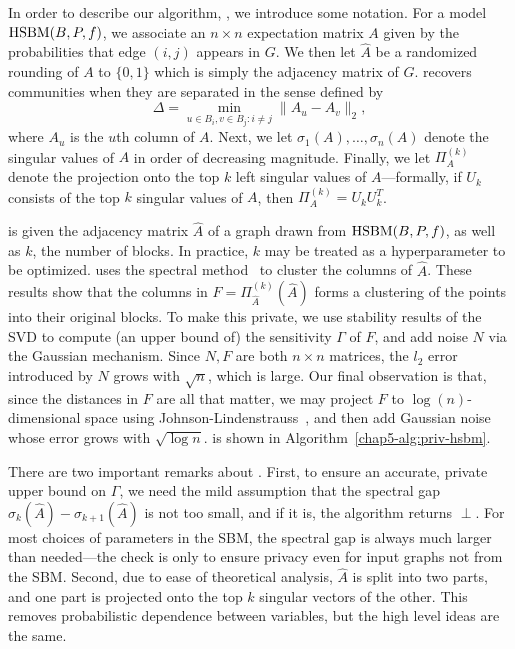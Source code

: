 In order to describe our algorithm, \dpcom{}, we introduce some notation. For a model $\textnormal{HSBM}{}(B,P,f)$, we associate an $n \times n$ expectation matrix $A$ given by the probabilities that edge $(i,j)$ appears in $G$. We then let $\hat{A}$ be a randomized rounding of $A$ to $\{0,1\}$ which is simply the adjacency matrix of $G$. \dpcom{} recovers communities when they are separated in the sense defined by 
\[
    \Delta = \min_{u \in B_i, v \in B_j : i \neq j} \|A_u - A_v\|_2,
\]
where $A_u$ is the $u$th column of $A$. Next, we let $\sigma_1(A), \ldots, \sigma_n(A)$ denote the singular values of $A$ in order of decreasing magnitude. Finally, we let $\Pi_A^{(k)}$ denote the projection onto the top $k$ left singular values of $A$---formally, if $U_k$ consists of the top $k$ singular values of $A$, then $\Pi_A^{(k)} = U_kU_k^T$.

\dpcom{} is given the adjacency matrix $\hat{A}$ of a graph drawn from $\textnormal{HSBM}(B,P,f)$, as well as $k$, the number of blocks. In practice, $k$ may be treated as a hyperparameter to be optimized. \dpcom{} uses the spectral method~\citep{mcsherry2001spectral, vu2014simple} to cluster the columns of $\hat{A}$. These results show that the columns in $F = \Pi_{\hat{A}}^{(k)}(\hat{A})$ forms a clustering of the points into their original blocks. To make this private, we use stability results of the SVD to compute (an upper bound of) the sensitivity $\Gamma$ of $F$, and add noise $N$ via the Gaussian mechanism. Since $N,F$ are both $n \times n$ matrices, the $l_2$ error introduced by $N$ grows with $\sqrt{n}$, which is large. Our final observation is that, since the distances in $F$ are all that matter, we may project $F$ to $\log(n)$-dimensional space using Johnson-Lindenstrauss~\citep{johnson1984extensions}, and then add Gaussian noise whose error grows with $\sqrt{\log n}$. \dpcom{} is shown in Algorithm~\ref{chap5-alg:priv-hsbm}.

There are two important remarks about \dpcom{}. First, to ensure an accurate, private upper bound on $\Gamma$, we need the mild assumption that the spectral gap $\sigma_k(\hat{A}) - \sigma_{k+1}(\hat{A})$ is not too small, and if it is, the algorithm returns $\perp$. For most choices of parameters in the SBM, the spectral gap is always much larger than needed---the check is only to ensure privacy even for input graphs not from the SBM. Second, due to ease of theoretical analysis, $\hat{A}$ is split into two parts, and one part is projected onto the top $k$ singular vectors of the other. This removes probabilistic dependence between variables, but the high level ideas are the same.

